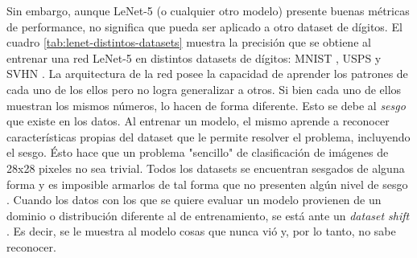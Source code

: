 Sin embargo, aunque LeNet-5 (o cualquier otro modelo) presente buenas m\'etricas de performance, no significa que pueda
ser aplicado a otro dataset de d\'igitos. El cuadro \ref{tab:lenet-distintos-datasets} muestra la precisi\'on que se
obtiene al entrenar una red LeNet-5 en distintos datasets de d\'igitos: MNIST \parencite{lecun1998gradient}, USPS \parencite{hull1994database} y SVHN \parencite{netzer2011reading}. La arquitectura de la red posee la capacidad de aprender los patrones de cada uno de los
ellos pero no logra generalizar a otros. Si bien cada uno de ellos muestran los mismos n\'umeros, lo hacen de forma
diferente. Esto se debe al {\it sesgo} que existe en los datos. Al entrenar un modelo, el mismo aprende a reconocer
caracter\'isticas propias del dataset que le permite resolver el problema, incluyendo el sesgo. \'Esto hace que un
problema "sencillo" de clasificaci\'on de im\'agenes de 28x28 pixeles no sea trivial. Todos los datasets se encuentran
sesgados de alguna forma y es imposible armarlos de tal forma que no presenten alg\'un nivel de sesgo \parencite{khosla2012undoing}. Cuando los datos con los que se quiere evaluar un modelo provienen de un dominio o
distribuci\'on diferente al de entrenamiento, se est\'a ante un {\it dataset shift} \parencite{quinonero2008dataset}. Es decir, se le muestra al modelo cosas que nunca vi\'o y, por lo tanto, no sabe
reconocer.

